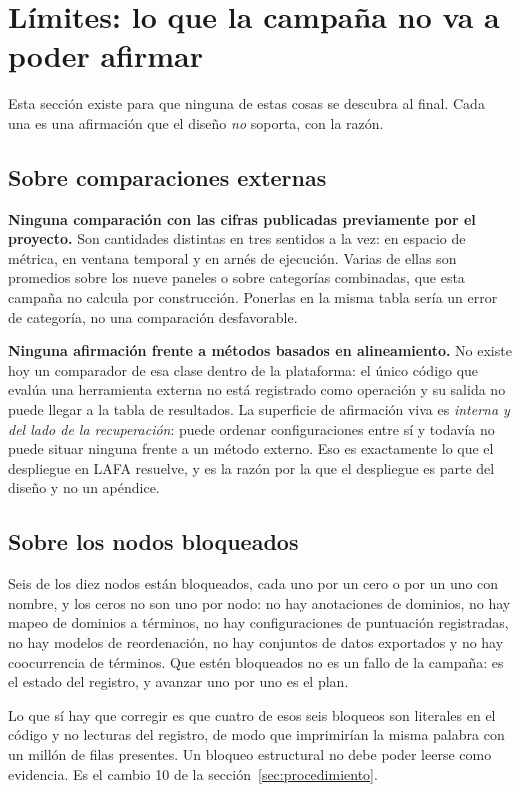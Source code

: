 \section{Límites: lo que la campaña no va a poder afirmar}
\label{sec:limites}

Esta sección existe para que ninguna de estas cosas se descubra al final. Cada una
es una afirmación que el diseño \emph{no} soporta, con la razón.

\subsection{Sobre comparaciones externas}

\textbf{Ninguna comparación con las cifras publicadas previamente por el proyecto.}
Son cantidades distintas en tres sentidos a la vez: en espacio de métrica, en
ventana temporal y en arnés de ejecución. Varias de ellas son promedios sobre los
nueve paneles o sobre categorías combinadas, que esta campaña no calcula por
construcción. Ponerlas en la misma tabla sería un error de categoría, no una
comparación desfavorable.

\textbf{Ninguna afirmación frente a métodos basados en alineamiento.} No existe hoy
un comparador de esa clase dentro de la plataforma: el único código que evalúa una
herramienta externa no está registrado como operación y su salida no puede llegar a
la tabla de resultados. La superficie de afirmación viva es \emph{interna y del lado
de la recuperación}: puede ordenar configuraciones entre sí y todavía no puede
situar ninguna frente a un método externo. Eso es exactamente lo que el despliegue
en LAFA resuelve, y es la razón por la que el despliegue es parte del diseño y no un
apéndice.

\subsection{Sobre los nodos bloqueados}

Seis de los diez nodos están bloqueados, cada uno por un cero o por un uno con
nombre, y los ceros no son uno por nodo: no hay
anotaciones de dominios, no hay mapeo de dominios a términos, no hay configuraciones
de puntuación registradas, no hay modelos de reordenación, no hay conjuntos de
datos exportados y no hay coocurrencia de términos. Que estén bloqueados no es un
fallo de la campaña: es el estado del registro, y avanzar uno por uno es el plan.

Lo que sí hay que corregir es que cuatro de esos seis bloqueos son literales en el
código y no lecturas del registro, de modo que imprimirían la misma palabra con un
millón de filas presentes. Un bloqueo estructural no debe poder leerse como
evidencia. Es el cambio 10 de la sección~\ref{sec:procedimiento}.

